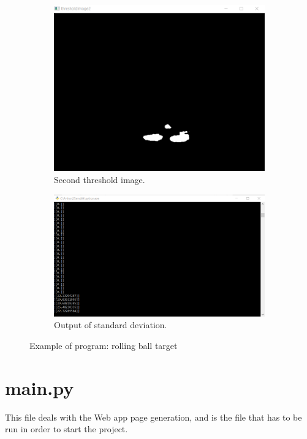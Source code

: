 \documentclass[a4paper,12pt]{report}
\begin{document}
\begin{figure}[h!]
\begin{subfigure}[b]{0.4\linewidth}
    \includegraphics[width=\linewidth]{fig/img5.png}
    \caption{Second threshold image.}
  \end{subfigure}
\hspace{0.5cm}
	\begin{subfigure}[b]{0.4\linewidth}
    \includegraphics[width=\linewidth]{fig/img6.png}
    \caption{Output of standard deviation.}
  \end{subfigure}
  \caption{Example of program: rolling ball target}
  \label{fig:pic1}
\end{figure}

\vspace{0.5cm}

\section{main.py}
This file deals with the Web app page generation, and is the file that has to be run in order to start the project. 
\end{document}
